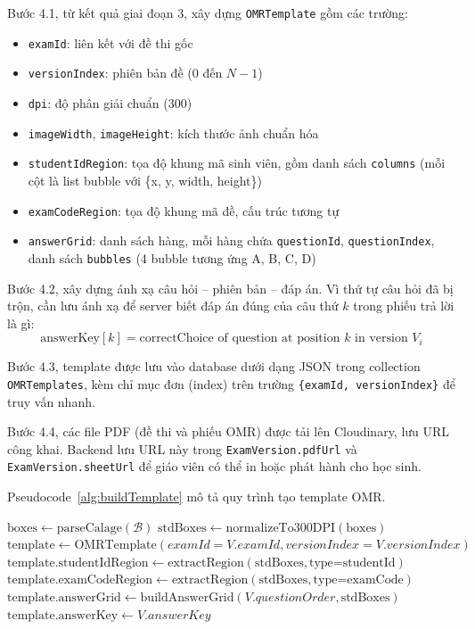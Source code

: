 ﻿\documentclass[../DoAn.tex]{subfiles}
\begin{document}
Bước 4.1, từ kết quả giai đoạn 3, xây dựng \texttt{OMRTemplate} gồm các trường:
\begin{itemize}
  \item \texttt{examId}: liên kết với đề thi gốc
  \item \texttt{versionIndex}: phiên bản đề (0 đến $N-1$)
  \item \texttt{dpi}: độ phân giải chuẩn (300)
  \item \texttt{imageWidth}, \texttt{imageHeight}: kích thước ảnh chuẩn hóa
  \item \texttt{studentIdRegion}: tọa độ khung mã sinh viên, gồm danh sách \texttt{columns} (mỗi cột là list bubble với \{x, y, width, height\})
  \item \texttt{examCodeRegion}: tọa độ khung mã đề, cấu trúc tương tự
  \item \texttt{answerGrid}: danh sách hàng, mỗi hàng chứa \texttt{questionId}, \texttt{questionIndex}, danh sách \texttt{bubbles} (4 bubble tương ứng A, B, C, D)
\end{itemize}

Bước 4.2, xây dựng ánh xạ câu hỏi -- phiên bản -- đáp án. Vì thứ tự câu hỏi đã bị trộn, cần lưu ánh xạ để server biết đáp án đúng của câu thứ $k$ trong phiếu trả lời là gì:
\begin{equation}
    \text{answerKey}[k] = \text{correctChoice of question at position } k \text{ in version } V_i
\end{equation}

Bước 4.3, template được lưu vào database dưới dạng JSON trong collection \texttt{OMRTemplates}, kèm chỉ mục đơn (index) trên trường \texttt{\{examId, versionIndex\}} để truy vấn nhanh.

Bước 4.4, các file PDF (đề thi và phiếu OMR) được tải lên Cloudinary, lưu URL công khai. Backend lưu URL này trong \texttt{ExamVersion.pdfUrl} và \texttt{ExamVersion.sheetUrl} để giáo viên có thể in hoặc phát hành cho học sinh.

Pseudocode~\ref{alg:buildTemplate} mô tả quy trình tạo template OMR.

\begin{algorithm}[H]
\caption{Xây dựng template OMR}
\label{alg:buildTemplate}
\SetAlgoLined
{}
 $\text{boxes} \gets \text{parseCalage}(\mathcal{B})$ \;
 $\text{stdBoxes} \gets \text{normalizeTo300DPI}(\text{boxes})$ \;
 $\text{template} \gets \text{OMRTemplate}(examId=V.examId, versionIndex=V.versionIndex)$ \;
 $\text{template.studentIdRegion} \gets \text{extractRegion}(\text{stdBoxes}, \text{type=studentId})$ \;
 $\text{template.examCodeRegion} \gets \text{extractRegion}(\text{stdBoxes}, \text{type=examCode})$ \;
 $\text{template.answerGrid} \gets \text{buildAnswerGrid}(V.questionOrder, \text{stdBoxes})$ \;
 $\text{template.answerKey} \gets V.answerKey$ \;
  \;
\end{algorithm}
\end{document}
